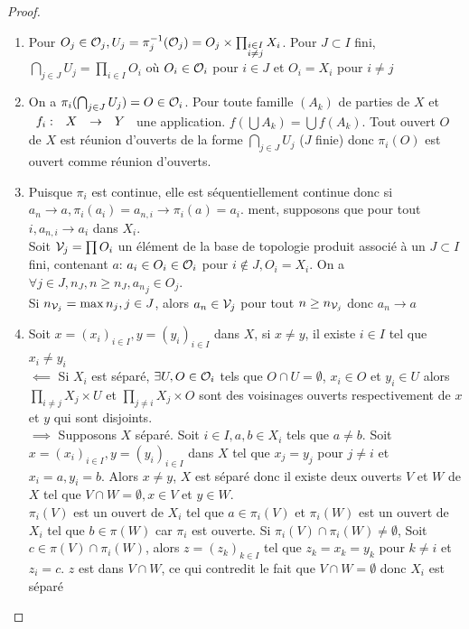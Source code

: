 \documentclass[]{report}
\begin{document}
    \begin{proof}{}{}
        \begin{enumerate}
            \item Pour $O_j\in\mathcal{O}_j,U_j=\pi_j^{-1}(\mathcal{O}_j)=O_j\times\prod_{\substack{i\in I\\ i\neq j}}X_i$. Pour $J\subset I$ fini, $\bigcap_{j\in J}U_j=\prod_{i\in I}O_i$ où $O_i\in \mathcal{O}_i$ pour $i\in J$ et $O_i=X_i$ pour $i\neq j$
            \item On a $\pi_i(\bigcap_{j\in J}U_j)=O\in\mathcal{O}_i$. Pour toute famille $(A_k)$ de parties de $X$ et $\begin{array}{ccccc} f_i : & X & \to & Y \end{array}$ une application. $f(\bigcup A_k)=\bigcup f(A_k)$. Tout ouvert $O$ de $X$ est réunion d'ouverts de la forme $\bigcap_{j\in J} U_j$ ($J$ finie) donc $\pi_i(O)$ est ouvert comme réunion d'ouverts.
            \item Puisque $\pi_i$ est continue, elle est séquentiellement continue donc si $a_n\to a,\pi_i(a_i)=a_{n,i}\to\pi_i(a)=a_i$. ment, supposons que pour tout $i, a_{n,i}\to a_i$ dans $X_i$.\\
            Soit $\mathcal{V}_j=\prod O_i$ un élément de la base de topologie produit associé à un $J\subset I$ fini, contenant $a$: $a_i\in O_i\in \mathcal{O}_i$ pour $i\notin J,O_i=X_i$. On a $\forall j\in J, n_J,n\ge n_J,{a_n}_j\in O_j$.\\
            Si $n_{\mathcal{V}_j}=\max{n_j,j\in J}$, alors $a_n\in \mathcal{V}_j$ pour tout $n\ge n_{\mathcal{V}_j}$ donc $a_n\to a$
            \item Soit $x=(x_i)_{i\in I},y=(y_i)_{i\in I}$ dans $X$, si $x\neq y$, il existe $i\in I$ tel que $x_i\neq y_i$\\
            $\impliedby$ Si $X_i$ est séparé, $\exists U,O\in\mathcal{O}_i$ tels que $O\cap U=\emptyset$, $x_i\in O$ et $y_i\in U$ alors $\prod_{i\neq j}X_j\times U$ et $\prod_{j\neq i}X_j\times O$ sont des voisinages ouverts respectivement de $x$ et $y$ qui sont disjoints.\\
            $\implies$ Supposons $X$ séparé. Soit $i\in I, a,b\in X_i$ tels que $a\neq b$. Soit $x=(x_i)_{i\in I},y=(y_i)_{i\in I}$ dans $X$ tel que $x_j=y_j$ pour $j\neq i$ et $x_i=a,y_i=b$. Alors $x\neq y$, $X$ est séparé donc il existe deux ouverts $V$ et $W$ de $X$ tel que $V\cap W=\emptyset,x\in V$ et $y\in W$.\\
            $\pi_i(V)$ est un ouvert de $X_i$ tel que $a\in\pi_i(V)$ et $\pi_i(W)$ est un ouvert de $X_i$ tel que $b\in \pi(W)$ car $\pi_i$ est ouverte. Si $\pi_i(V)\cap\pi_i(W)\neq \emptyset$, Soit $c\in\pi(V)\cap \pi_i(W)$, alors $z=(z_k)_{k\in I}$ tel que $z_k=x_k=y_k$ pour $k\neq i$ et $z_i=c$. $z$ est dans $V\cap W$, ce qui contredit le fait que $V\cap W=\emptyset$ donc $X_i$ est séparé
        \end{enumerate}
    \end{proof}
\end{document}
